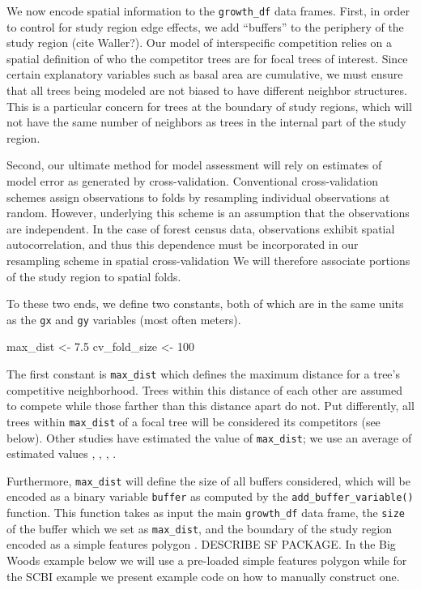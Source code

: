\documentclass[12pt]{article}
\newenvironment{Shaded}{\begin{snugshade}}{\end{snugshade}}
\newcommand{\DecValTok}[1]{\textcolor[rgb]{0.00,0.00,0.81}{#1}}
\newcommand{\FloatTok}[1]{\textcolor[rgb]{0.00,0.00,0.81}{#1}}
\newcommand{\NormalTok}[1]{#1}
\newcommand{\StringTok}[1]{\textcolor[rgb]{0.31,0.60,0.02}{#1}}
\begin{document}
We now encode spatial information to the \texttt{growth\_df} data
frames. First, in order to control for study region edge effects, we add
``buffers'' to the periphery of the study region (cite Waller?). Our
model of interspecific competition relies on a spatial definition of who
the competitor trees are for focal trees of interest. Since certain
explanatory variables such as basal area are cumulative, we must ensure
that all trees being modeled are not biased to have different neighbor
structures. This is a particular concern for trees at the boundary of
study regions, which will not have the same number of neighbors as trees
in the internal part of the study region.

Second, our ultimate method for model assessment will rely on estimates
of model error as generated by cross-validation. Conventional
cross-validation schemes assign observations to folds by resampling
individual observations at random. However, underlying this scheme is an
assumption that the observations are independent. In the case of forest
census data, observations exhibit spatial autocorrelation, and thus this
dependence must be incorporated in our resampling scheme in spatial
cross-validation \citet{roberts_cross-validation_2017}
\citet{pohjankukka_estimating_2017} We will therefore associate portions
of the study region to spatial folds.

To these two ends, we define two constants, both of which are in the
same units as the \texttt{gx} and \texttt{gy} variables (most often
meters).

\begin{Shaded}
\begin{Highlighting}[]
\NormalTok{max_dist <-}\StringTok{ }\FloatTok{7.5}
\NormalTok{cv_fold_size <-}\StringTok{ }\DecValTok{100}
\end{Highlighting}
\end{Shaded}

The first constant is \texttt{max\_dist} which defines the maximum
distance for a tree's competitive neighborhood. Trees within this
distance of each other are assumed to compete while those farther than
this distance apart do not. Put differently, all trees within
\texttt{max\_dist} of a focal tree will be considered its competitors
(see below). Other studies have estimated the value of
\texttt{max\_dist}; we use an average of estimated values
\citet{canham_neighborhood_2004}, \citet{uriarte_spatially_2004},
\citet{tatsumi2013}, \citet{canham_neighborhood_2006}.

Furthermore, \texttt{max\_dist} will define the size of all buffers
considered, which will be encoded as a binary variable \texttt{buffer}
as computed by the \texttt{add\_buffer\_variable()} function. This
function takes as input the main \texttt{growth\_df} data frame, the
\texttt{size} of the buffer which we set as \texttt{max\_dist}, and the
boundary of the study region encoded as a simple features polygon
\citet{pebesma_simple_2018}. DESCRIBE SF PACKAGE. In the Big Woods
example below we will use a pre-loaded simple features polygon while for
the SCBI example we present example code on how to manually construct
one.
\end{document}
